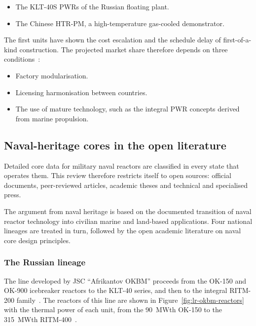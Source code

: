 \begin{itemize}
  \item The KLT-40S PWRs of the Russian floating plant.

  \item The Chinese HTR-PM, a high-temperature gas-cooled demonstrator.
\end{itemize}

The first units have shown the cost escalation and the schedule delay of
first-of-a-kind construction. The projected market share therefore
depends on three conditions~\cite{ritm200n_nei_2024}:

\begin{itemize}
  \item Factory modularisation.

  \item Licensing harmonisation between countries.

  \item The use of mature technology, such as the integral PWR concepts
        derived from marine propulsion.
\end{itemize}

\subsection{Naval-heritage cores in the open literature}
\label{subsec:naval-heritage}

Detailed core data for military naval reactors are classified in every
state that operates them. This review therefore restricts itself to
open sources: official documents, peer-reviewed articles, academic
theses and technical and specialised press.

The argument from naval heritage is based on the documented transition of
naval reactor technology into civilian marine and land-based
applications. Four national lineages are treated in turn, followed by
the open academic literature on naval core design principles.

\subsubsection{The Russian lineage}
\label{subsec:lineage-russia}
The line developed by JSC ``Afrikantov OKBM'' proceeds from the OK-150
and OK-900 icebreaker reactors to the KLT-40 series, and then to the
integral RITM-200 family~\cite{worldnuclearreport_smr}. The reactors of
this line are shown in Figure~\ref{fig:lr-okbm-reactors} with the
thermal power of each unit, from the 90~MWth OK-150 to the 315~MWth
RITM-400~\cite{rosatom_presentation}.

